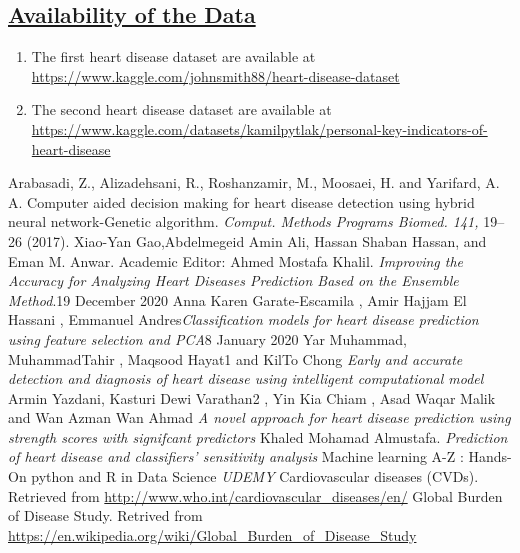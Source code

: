 \documentclass[11pt]{article}
\begin{document}
\subsection{\underline{Availability of the Data}}
\begin{enumerate}
\item The first heart disease dataset are available at  \url {https://www.kaggle.com/johnsmith88/heart-disease-dataset}
\item The second heart disease dataset are available at \url {https://www.kaggle.com/datasets/kamilpytlak/personal-key-indicators-of-heart-disease}

\end{enumerate}
\begin{thebibliography}{}
 Arabasadi, Z., Alizadehsani, R., Roshanzamir, M., Moosaei, H. and Yarifard, A. A. Computer aided decision making for heart disease 
detection using hybrid neural network-Genetic algorithm. \textit{Comput. Methods Programs Biomed. 141,} 19–26 (2017).
Xiao-Yan Gao,Abdelmegeid Amin Ali, Hassan Shaban Hassan, and Eman M. Anwar. Academic Editor: Ahmed Mostafa Khalil. \textit{Improving the Accuracy for Analyzing Heart Diseases Prediction Based on the Ensemble Method}.19 December 2020
Anna Karen Garate-Escamila  , Amir Hajjam El Hassani , Emmanuel Andres\textit{Classification models for heart disease prediction using feature selection and PCA}8 January 2020
Yar Muhammad, MuhammadTahir
, Maqsood Hayat1 and  KilTo Chong \textit{Early and accurate detection 
and diagnosis of heart disease 
using intelligent computational 
model}
Armin Yazdani, Kasturi Dewi Varathan2 , Yin Kia Chiam
, Asad Waqar Malik and Wan Azman Wan Ahmad \textit{A novel approach for heart disease 
prediction using strength scores with signifcant 
predictors}
Khaled Mohamad Almustafa. \textit{Prediction of heart disease and classifiers’
sensitivity analysis}
Machine learning A-Z : Hands-On python and R in Data Science \textit{UDEMY}
Cardiovascular diseases (CVDs). Retrieved from \url{http://www.who.int/cardiovascular_diseases/en/}
Global Burden of Disease Study.  Retrived from \url{https://en.wikipedia.org/wiki/Global_Burden_of_Disease_Study}
\end{thebibliography}
\end{document}
